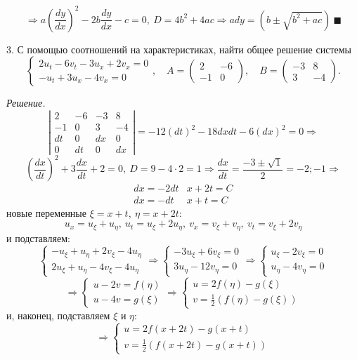 \documentclass[9pt]{article}
\begin{document}
\[\Rightarrow a\left(\dfrac{dy}{dx}\right)^2-2b\dfrac{dy}{dx}-c=0,\ D=4b^2+4ac\Rightarrow ady=(b\pm \sqrt{b^2+ac})\ \blacksquare\]
\par3. С помощью соотношений на характеристиках, найти общее решение системы
\[\left\{\begin{array}{l}
    2u_t-6v_t-3u_x+2v_x=0 \\
    -u_t+3u_x-4v_x=0
\end{array}\right.,\quad A=\left(
\begin{array}{cc}
    2 & -6 \\
    -1 & 0
\end{array}\right),\quad B=\left(
\begin{array}{cc}
    -3 & 8 \\
    3 & -4
\end{array}\right).\]
\par\textit{Решение.}
\[\left|
\begin{array}{cccc}
    2 & -6 & -3 & 8 \\
    -1 & 0 & 3 & -4 \\
    dt & 0 & dx & 0 \\
    0 & dt & 0 & dx
\end{array}\right|=-12(dt)^2-18dxdt-6(dx)^2=0\Rightarrow\]
\[\left(\dfrac{dx}{dt}\right)^2+3\dfrac{dx}{dt}+2=0,\ D=9 -4\cdot2=1 \Rightarrow \dfrac{dx}{dt}=\dfrac{-3\pm\sqrt 1}{2}=-2;-1\Rightarrow\]
\[\begin{array}{cc}
    dx=-2dt & x+2t=C \\
    dx=-dt & x+t=C
\end{array}\]
 новые переменные \(\xi=x+t,\ \eta=x+2t\):
\[u_x=u_\xi+u_\eta,\ u_t=u_\xi+2u_\eta,\ v_x=v_\xi+v_\eta,\ v_t=v_\xi+2v_\eta\]
и подставляем:
\[\left\{\begin{array}{l}
    -u_\xi+u_\eta+2v_\xi-4u_\eta \\
    2u_\xi+u_\eta-4v_\xi-4u_\eta
\end{array}\right.\Rightarrow
\left\{\begin{array}{l}
    -3u_\xi+6v_\xi=0 \\
    3u_\eta-12v_\eta=0
\end{array}\right.\Rightarrow
\left\{\begin{array}{l}
    u_\xi-2v_\xi=0 \\
    u_\eta-4v_\eta=0
\end{array}\right.\]
\[\Rightarrow
\left\{\begin{array}{l}
    u-2v=f(\eta) \\
    u-4v=g(\xi)
\end{array}\right.\Rightarrow
\left\{\begin{array}{l}
    u=2f(\eta)-g(\xi) \\
    v=\frac{1}{2}(f(\eta)-g(\xi))
\end{array}\right.\]
и, наконец, подставляем \(\xi\) и \(\eta\):
\[\Rightarrow
\left\{\begin{array}{l}
    u=2f(x+2t)-g(x+t) \\
    v=\frac{1}{2}(f(x+2t)-g(x+t))
\end{array}\right.\]
\end{document}
